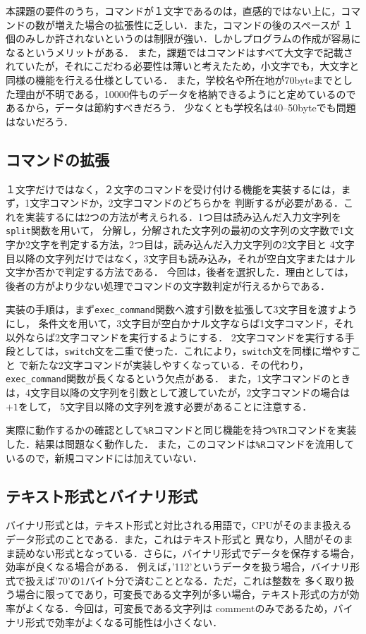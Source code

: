 \documentclass[a4paper,11pt]{jarticle}
\begin{document}
本課題の要件のうち，コマンドが１文字であるのは，直感的ではない上に，コマンドの数が増えた場合の拡張性に乏しい．また，コマンドの後のスペースが
１個のみしか許されないというのは制限が強い．しかしプログラムの作成が容易になるというメリットがある．
また，課題ではコマンドはすべて大文字で記載されていたが，それにこだわる必要性は薄いと考えたため，小文字でも，大文字と同様の機能を行える仕様としている．
また，学校名や所在地が70byteまでとした理由が不明である，10000件ものデータを格納できるようにと定めているのであるから，データは節約すべきだろう．
少なくとも学校名は40--50byteでも問題はないだろう．

\subsection{コマンドの拡張}

１文字だけではなく，２文字のコマンドを受け付ける機能を実装するには，まず，1文字コマンドか，2文字コマンドのどちらかを
判断するが必要がある．これを実装するには2つの方法が考えられる．1つ目は読み込んだ入力文字列を\verb|split|関数を用いて，
分解し，分解された文字列の最初の文字列の文字数で1文字か2文字を判定する方法，2つ目は，読み込んだ入力文字列の2文字目と
4文字目以降の文字列だけではなく，3文字目も読み込み，それが空白文字またはナル文字か否かで判定する方法である．
今回は，後者を選択した．理由としては，後者の方がより少ない処理でコマンドの文字数判定が行えるからである．

実装の手順は，まず\verb|exec_command|関数へ渡す引数を拡張して3文字目を渡すようにし，
条件文を用いて，3文字目が空白かナル文字ならば1文字コマンド，それ以外ならば2文字コマンドを実行するようにする．
2文字コマンドを実行する手段としては，\verb|switch|文を二重で使った．これにより，\verb|switch|文を同様に増やすこと
で新たな2文字コマンドが実装しやすくなっている．その代わり，\verb|exec_command|関数が長くなるという欠点がある．
また，1文字コマンドのときは，4文字目以降の文字列を引数として渡していたが，2文字コマンドの場合は$+1$をして，
5文字目以降の文字列を渡す必要があることに注意する．

実際に動作するかの確認として\verb|%R|コマンドと同じ機能を持つ\verb|%TR|コマンドを実装した．結果は問題なく動作した．
また，このコマンドは\verb|%R|コマンドを流用しているので，新規コマンドには加えていない．

\subsection{テキスト形式とバイナリ形式}
バイナリ形式とは，テキスト形式と対比される用語で，CPUがそのまま扱えるデータ形式のことである．また，これはテキスト形式と
異なり，人間がそのまま読めない形式となっている．さらに，バイナリ形式でデータを保存する場合，効率が良くなる場合がある．
例えば，'112'というデータを扱う場合，バイナリ形式で扱えば'70'の1バイト分で済むこととなる．ただ，これは整数を
多く取り扱う場合に限ってであり，可変長である文字列が多い場合，テキスト形式の方が効率がよくなる．今回は，可変長である文字列は
commentのみであるため，バイナリ形式で効率がよくなる可能性は小さくない．
\end{document}
